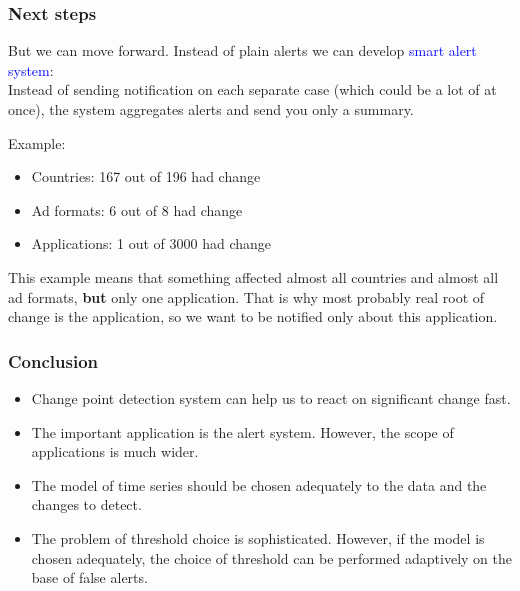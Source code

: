 \documentclass[intlimits, 9pt, unicode]{beamer}
\newcommand{\textblue}[1]{\textcolor{blue}{#1}}
\begin{document}
\begin{frame}
    \frametitle{Next steps}

But we can move forward. 
Instead of plain alerts we can develop \textblue{smart alert system}:\\

Instead of sending notification on each separate case (which could be a lot of at once), the system aggregates alerts and send you only a summary.

\bigskip
Example:

\medskip
 \begin{itemize}
	    \item Countries: 167 out of 196 had change
		\item Ad formats: 6 out of 8 had change
		\item Applications: 1 out of 3000 had change
\end{itemize}

\medskip
 This example means that something affected almost all countries and almost all ad formats, \textbf{but} only one application. That is why most probably real root of change is the application, so we want to be notified only about this application.

\end{frame}


\begin{frame}
    \frametitle{Conclusion}

	    \begin{itemize}
	    \item Change point detection system can help us to react on significant change fast.

\bigskip
		\item The important application is the alert system. However,  the scope of applications 
is much wider.

\bigskip
		\item The model of time series should be chosen adequately to the data and the changes to detect.

\bigskip
        \item The problem of threshold choice is sophisticated. However, if the model is chosen adequately,
        the choice of threshold can be performed adaptively on the base of false alerts. 	    \end{itemize}

 \end{frame}


\end{document}

